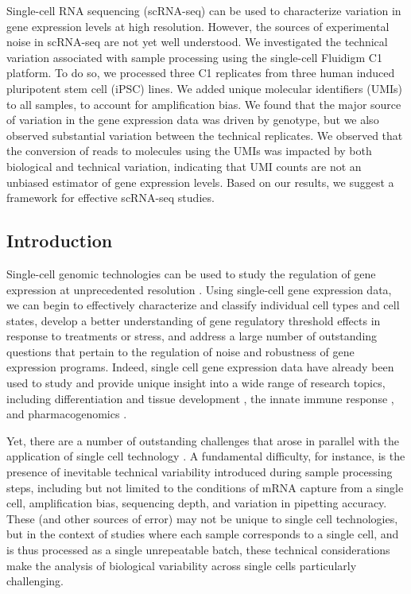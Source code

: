 
Single-cell RNA sequencing (scRNA-seq) can be used to characterize
variation in gene expression levels at high resolution. However, the
sources of experimental noise in scRNA-seq are not yet well understood.
We investigated the technical variation associated with sample
processing using the single-cell Fluidigm C1 platform. To do so, we
processed three C1 replicates from three human induced pluripotent stem
cell (iPSC) lines. We added unique molecular identifiers (UMIs) to all
samples, to account for amplification bias. We found that the major
source of variation in the gene expression data was driven by genotype,
but we also observed substantial variation between the technical
replicates. We observed that the conversion of reads to molecules using
the UMIs was impacted by both biological and technical variation,
indicating that UMI counts are not an unbiased estimator of gene
expression levels. Based on our results, we suggest a framework for
effective scRNA-seq studies.

\subsection{Introduction}\label{introduction}

Single-cell genomic technologies can be used to study the regulation of
gene expression at unprecedented resolution \citep{Macaulay2014,
Saliba2014}. Using single-cell gene expression data, we can begin to
effectively characterize and classify individual cell types and cell
states, develop a better understanding of gene regulatory threshold
effects in response to treatments or stress, and address a large number
of outstanding questions that pertain to the regulation of noise and
robustness of gene expression programs. Indeed, single cell gene
expression data have already been used to study and provide unique
insight into a wide range of research topics, including differentiation
and tissue development \citep{Macosko2015, Handel2016, Drissen2016},
the innate immune response \citep{Shalek2013, Jaitin2014}, and
pharmacogenomics \citep{Miyamoto2015, Kim2015}.

Yet, there are a number of outstanding challenges that arose in parallel
with the application of single cell technology \citep{Stegle2015}. A
fundamental difficulty, for instance, is the presence of inevitable
technical variability introduced during sample processing steps,
including but not limited to the conditions of mRNA capture from a
single cell, amplification bias, sequencing depth, and variation in
pipetting accuracy. These (and other sources of error) may not be unique
to single cell technologies, but in the context of studies where each
sample corresponds to a single cell, and is thus processed as a single
unrepeatable batch, these technical considerations make the analysis of
biological variability across single cells particularly challenging.

